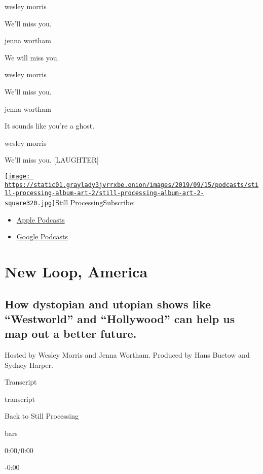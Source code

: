wesley morris

We'll miss you.

jenna wortham

We will miss you.

wesley morris

We'll miss you.

jenna wortham

It sounds like you're a ghost.

wesley morris

We'll miss you. {[}LAUGHTER{]}

\href{https://www.nytimes3xbfgragh.onion/column/still-processing-podcast}{\texttt{[image: https://static01.graylady3jvrrxbe.onion/images/2019/09/15/podcasts/still-processing-album-art-2/still-processing-album-art-2-square320.jpg]}Still
Processing}Subscribe:

\begin{itemize}
\tightlist
\item
  \href{https://itunes.apple.com/us/podcast/id1151436460}{Apple
  Podcasts}
\item
  \href{https://www.google.com/podcasts?feed=aHR0cHM6Ly9yc3MuYXJ0MTkuY29tL255dC1zdGlsbC1wcm9jZXNzaW5n}{Google
  Podcasts}
\end{itemize}

\hypertarget{new-loop-america-1}{%
\section{New Loop, America}\label{new-loop-america-1}}

\hypertarget{how-dystopian-and-utopian-shows-like-westworld-and-hollywood-can-help-us-map-out-a-better-future-1}{%
\subsection{How dystopian and utopian shows like ``Westworld'' and
``Hollywood'' can help us map out a better
future.}\label{how-dystopian-and-utopian-shows-like-westworld-and-hollywood-can-help-us-map-out-a-better-future-1}}

Hosted by Wesley Morris and Jenna Wortham. Produced by Hans Buetow and
Sydney Harper.

Transcript

transcript

Back to Still Processing

bars

0:00/0:00

-0:00

